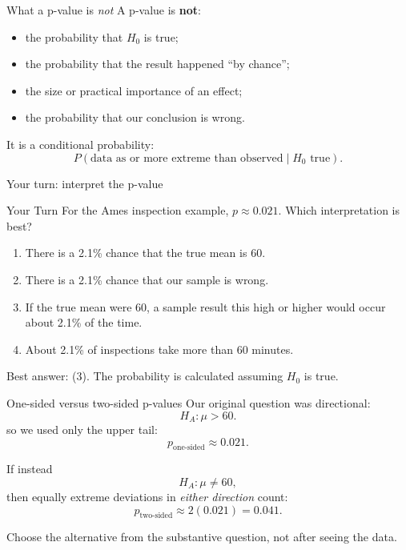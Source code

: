 \documentclass[11pt,aspectratio=169]{beamer}
\newcommand{\yourturn}[1]{%
\pause
\begin{center}
\begin{minipage}{0.90\textwidth}
\begin{alertblock}{Your Turn}
#1
\end{alertblock}
\end{minipage}
\end{center}}
\begin{document}
\begin{frame}{What a p-value is \emph{not}}
A p-value is \textbf{not}:

\begin{itemize}
  \item the probability that $H_0$ is true;
  \item the probability that the result happened ``by chance'';
  \item the size or practical importance of an effect;
  \item the probability that our conclusion is wrong.
\end{itemize}

\vfill
It is a conditional probability:
\[
P(\text{data as or more extreme than observed}\mid H_0\text{ true}).
\]
\end{frame}

\begin{frame}{Your turn: interpret the p-value}
\yourturn{For the Ames inspection example, $p\approx0.021$. Which interpretation is best?}

\begin{enumerate}
  \item There is a 2.1\% chance that the true mean is 60.
  \item There is a 2.1\% chance that our sample is wrong.
  \item If the true mean were 60, a sample result this high or higher would occur about 2.1\% of the time.
  \item About 2.1\% of inspections take more than 60 minutes.
\end{enumerate}

\pause
\begin{center}
\alert{Best answer: (3). The probability is calculated assuming $H_0$ is true.}
\end{center}
\end{frame}

\begin{frame}{One-sided versus two-sided p-values}
Our original question was directional:
\[
H_A:\mu>60.
\]
so we used only the upper tail:
\[
p_{\text{one-sided}}\approx0.021.
\]

If instead
\[
H_A:\mu\ne60,
\]
then equally extreme deviations in \emph{either direction} count:
\[
p_{\text{two-sided}}\approx2(0.021)=0.041.
\]

\vfill
Choose the alternative from the substantive question, \alert{not after seeing the data}.
\end{frame}
\end{document}
